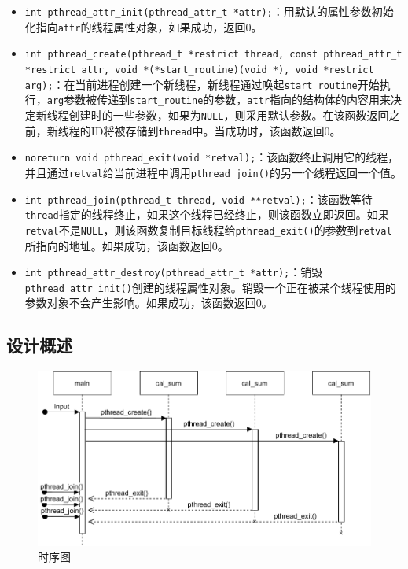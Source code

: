 \documentclass[lang=cn,11pt,a4paper,cite=authornum]{paper}
\begin{document}
\begin{itemize}
    \item \texttt{int pthread_attr_init(pthread_attr_t *attr);}：用默认的属性参数初始化指向\texttt{attr}的线程属性对象，如果成功，返回0。
    \item \texttt{int pthread_create(pthread_t *restrict thread, const pthread_attr_t *restrict attr, void *(*start_routine)(void *), void *restrict arg);}：在当前进程创建一个新线程，新线程通过唤起\texttt{start_routine}开始执行，\texttt{arg}参数被传递到\texttt{start_routine}的参数，\texttt{attr}指向的结构体的内容用来决定新线程创建时的一些参数，如果为\texttt{NULL}，则采用默认参数。在该函数返回之前，新线程的ID将被存储到\texttt{thread}中。当成功时，该函数返回0。
    \item \texttt{noreturn void pthread_exit(void *retval);}：该函数终止调用它的线程，并且通过\texttt{retval}给当前进程中调用\texttt{pthread_join()}的另一个线程返回一个值。
    \item \texttt{int pthread_join(pthread_t thread, void **retval);}：该函数等待\texttt{thread}指定的线程终止，如果这个线程已经终止，则该函数立即返回。如果\texttt{retval}不是\texttt{NULL}，则该函数复制目标线程给\texttt{pthread_exit()}的参数到\texttt{retval}所指向的地址。如果成功，该函数返回0。
    \item \texttt{int pthread_attr_destroy(pthread_attr_t *attr);}：销毁\texttt{pthread_attr_init()}创建的线程属性对象。销毁一个正在被某个线程使用的参数对象不会产生影响。如果成功，该函数返回0。
\end{itemize}

\subsection{设计概述}

\begin{figure}[htbp]

    \centering
    \includegraphics[width=0.8\linewidth]{./images/UML1.pdf}
    \caption{时序图\label{fig:UML1}}

\end{figure}
\end{document}

